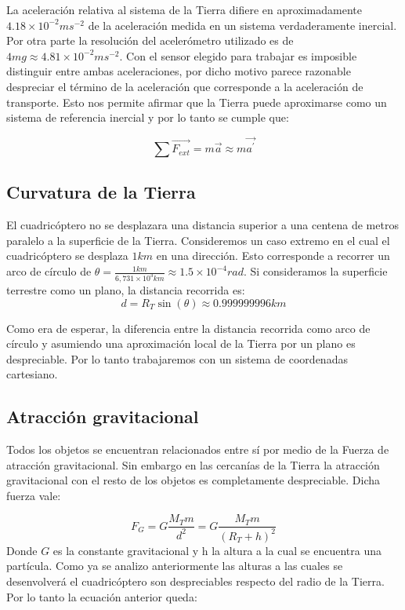 \documentclass[main]{subfiles}
\begin{document}
La aceleraci\'on relativa al sistema de la Tierra difiere en aproximadamente $4.18\times10^{-2}ms^{-2}$ de la aceleraci\'on medida en un sistema verdaderamente inercial. Por otra parte la resoluci\'on del aceler\'ometro utilizado es de $4mg\approx 4.81\times10^{-2}ms^{-2}$. Con el sensor elegido para trabajar es imposible distinguir entre ambas aceleraciones, por dicho motivo parece razonable despreciar el t\'ermino de la aceleraci\'on que corresponde a la aceleraci\'on de transporte. Esto nos permite afirmar que la Tierra puede aproximarse como un sistema de referencia inercial y por lo tanto se cumple que:

\begin{equation}
\sum \vec{F_{ext}}=m\vec{a}\approx m\vec{a^\prime}
\end{equation}



\subsection{Curvatura de la Tierra}
El cuadric\'optero no se desplazara una distancia superior a una centena de metros paralelo a la superficie de la Tierra. Consideremos un caso extremo en el cual el cuadric\'optero se desplaza $1km$ en una direcci\'on. Esto corresponde a recorrer un arco de c\'irculo de $\theta = \frac{1km}{6,731\times10^{3}km}\approx 1.5\times 10^{-4}rad$. Si consideramos la superficie terrestre como un plano, la distancia recorrida es: 
\begin{equation}
d=R_T\sin(\theta) \approx 0.999999996km
\end{equation}

Como era de esperar, la diferencia entre la distancia recorrida como arco de c\'irculo y asumiendo una aproximaci\'on local de la Tierra por un plano es despreciable. Por lo tanto trabajaremos con un sistema de coordenadas cartesiano.
\subsection{Atracci\'on gravitacional}
Todos los objetos se encuentran relacionados entre s\'i por medio de la Fuerza de atracci\'on gravitacional. Sin embargo en las cercan\'ias de la Tierra la atracci\'on gravitacional con el resto de los objetos es completamente despreciable. Dicha fuerza vale:

\begin{equation}
F_G=G\frac{M_Tm}{d^2}=G\frac{M_Tm}{(R_T+h)^2} 
\end{equation}
Donde $G$ es la constante gravitacional y h la altura a la cual se encuentra una part\'icula.  
Como ya se analizo anteriormente las alturas a las cuales se desenvolver\'a el cuadric\'optero son despreciables respecto del radio de la Tierra. Por lo tanto la ecuaci\'on anterior queda:
\end{document}
